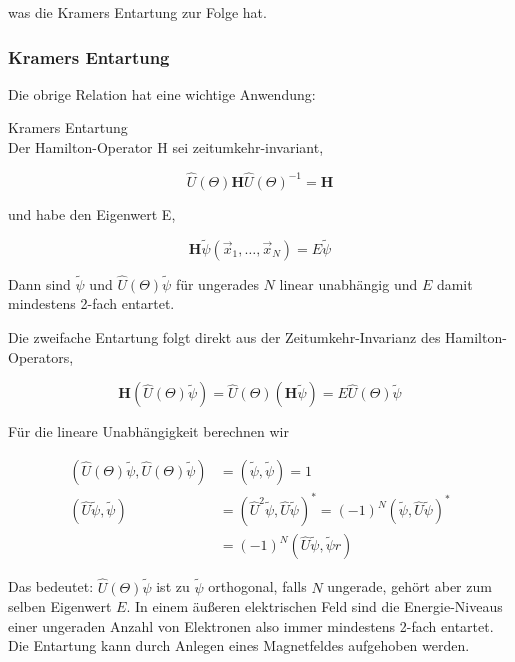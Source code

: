 \documentclass[10pt, letterpaper]{article}
\begin{document}
was die Kramers Entartung zur Folge hat.

\subsubsection*{Kramers Entartung}
Die obrige Relation hat eine wichtige Anwendung:

Kramers Entartung\\
Der Hamilton-Operator H sei zeitumkehr-invariant,

$$
\widehat{U}(\Theta) \mathbf{H} \widehat{U}(\Theta)^{-1}=\mathbf{H}
$$

und habe den Eigenwert E,

$$
\mathbf{H} \widetilde{\psi}\left(\vec{x}_{1}, \ldots, \vec{x}_{N}\right)=E \widetilde{\psi}
$$

Dann sind $\widetilde{\psi}$ und $\widehat{U}(\Theta) \widetilde{\psi}$ für ungerades $N$ linear unabhängig und $E$ damit mindestens 2-fach entartet.

Die zweifache Entartung folgt direkt aus der Zeitumkehr-Invarianz des Hamilton-Operators,

$$
\mathbf{H}(\widehat{U}(\Theta) \widetilde{\psi})=\widehat{U}(\Theta)(\mathbf{H} \widetilde{\psi})=E \widehat{U}(\Theta) \widetilde{\psi}
$$

Für die lineare Unabhängigkeit berechnen wir

$$
\begin{aligned}
(\widehat{U}(\Theta) \widetilde{\psi}, \widehat{U}(\Theta) \widetilde{\psi}) & =(\widetilde{\psi}, \widetilde{\psi})=1 \\
(\widehat{U} \widetilde{\psi}, \widetilde{\psi}) & =\left(\widehat{U}^{2} \widetilde{\psi}, \widehat{U} \widetilde{\psi}\right)^{*}=(-1)^{N}(\widetilde{\psi}, \widehat{U} \widetilde{\psi})^{*} \\
& =(-1)^{N}(\widehat{U} \widetilde{\psi}, \widetilde{\psi} r)
\end{aligned}
$$

Das bedeutet: $\widehat{U}(\Theta) \widetilde{\psi}$ ist zu $\widetilde{\psi}$ orthogonal, falls $N$ ungerade, gehört aber zum selben Eigenwert $E$. In einem äußeren elektrischen Feld sind die Energie-Niveaus einer ungeraden Anzahl von Elektronen also immer mindestens 2-fach entartet. Die Entartung kann durch Anlegen eines Magnetfeldes aufgehoben werden.
\end{document}
